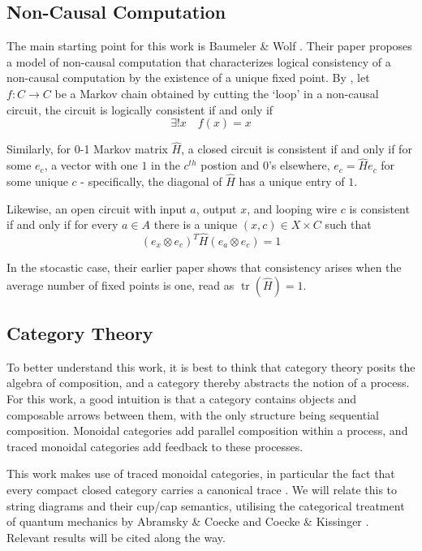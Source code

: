 \documentclass[10pt, a4paper]{article}
\newcommand{\tr}[0]{\operatorname{tr}}
\begin{document}
\subsection{Non-Causal Computation}

The main starting point for this work is Baumeler \& Wolf \cite{BaumelerWolf2017}. Their paper proposes a model of non-causal computation that characterizes logical consistency of a non-causal computation by the existence of a unique fixed point. By \cite[\S II]{BaumelerWolf2017}, let $f: C \to C$ be a Markov chain obtained by cutting the `loop' in a non-causal circuit, the circuit is logically consistent if and only if $$ \exists!x\quad f(x) = x $$

Similarly, for 0-1 Markov matrix $\hat{H}$, a closed circuit is consistent if and only if for some $e_c$, a vector with one $1$ in the $c^{th}$ postion and $0$'s elsewhere, $e_c = \hat{H}e_c$ for some unique $c$ - specifically, the diagonal of $\hat{H}$ has a unique entry of $1$.

Likewise, an open circuit with input $a$, output $x$, and looping wire $c$ is consistent if and only if for every $a \in A$ there is a unique $(x, c) \in X \times C$ such that \cite[\S III]{BaumelerWolf2017} $$ (e_x \otimes e_c)^T \hat{H} (e_a \otimes e_c) = 1 $$ 

In the stocastic case, their earlier paper \cite{Baumeler2016-so} shows that consistency arises when the average number of fixed points is one, read as $\tr(\hat{H}) = 1$.

\subsection{Category Theory}

To better understand this work, it is best to think that category theory posits the algebra of composition, and a category thereby abstracts the notion of a process. For this work, a good intuition is that a category contains objects and composable arrows between them, with the only structure being sequential composition. Monoidal categories add parallel composition within a process, and traced monoidal categories add feedback to these processes.

This work makes use of traced monoidal categories, in particular the fact that every compact closed category carries a canonical trace \cite{Joyal1996-bg}. We will relate this to string diagrams and their cup/cap semantics, utilising the categorical treatment of quantum mechanics by Abramsky \& Coecke \cite{Abramsky2004-xp} and Coecke \& Kissinger \cite{Coecke2017-kx}. Relevant results will be cited along the way. 
\end{document}
